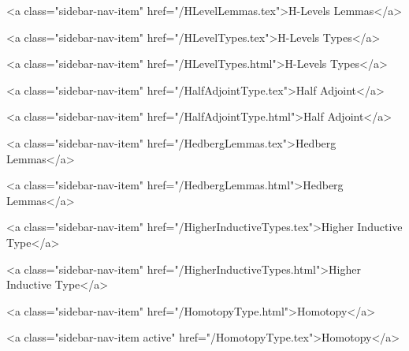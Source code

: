       
        
          <a class="sidebar-nav-item" href="/HLevelLemmas.tex">H-Levels Lemmas</a>
        
      
    
      
        
          <a class="sidebar-nav-item" href="/HLevelTypes.tex">H-Levels Types</a>
        
      
    
      
        
          <a class="sidebar-nav-item" href="/HLevelTypes.html">H-Levels Types</a>
        
      
    
      
        
          <a class="sidebar-nav-item" href="/HalfAdjointType.tex">Half Adjoint</a>
        
      
    
      
        
          <a class="sidebar-nav-item" href="/HalfAdjointType.html">Half Adjoint</a>
        
      
    
      
        
          <a class="sidebar-nav-item" href="/HedbergLemmas.tex">Hedberg Lemmas</a>
        
      
    
      
        
          <a class="sidebar-nav-item" href="/HedbergLemmas.html">Hedberg Lemmas</a>
        
      
    
      
        
          <a class="sidebar-nav-item" href="/HigherInductiveTypes.tex">Higher Inductive Type</a>
        
      
    
      
        
          <a class="sidebar-nav-item" href="/HigherInductiveTypes.html">Higher Inductive Type</a>
        
      
    
      
        
          <a class="sidebar-nav-item" href="/HomotopyType.html">Homotopy</a>
        
      
    
      
        
          <a class="sidebar-nav-item active" href="/HomotopyType.tex">Homotopy</a>
        
